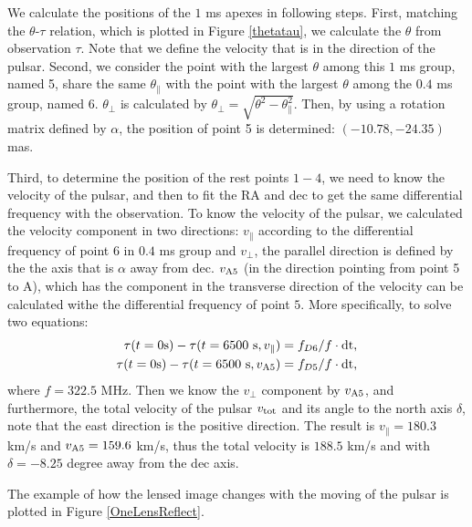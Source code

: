 \documentclass[useAMS,usenatbib]{mn2e}
\begin{document}
We calculate the positions of the $1$ ms apexes in following steps. First, matching the $\theta$-$\tau$ relation, which is plotted in Figure \ref{thetatau}, we calculate the $\theta$ from observation $\tau$. Note that we define the velocity that is in the direction of the pulsar. Second, we consider the point with the largest $\theta$ among this $1$ ms group, named 5, share the same $\theta_{\parallel}$ with the point with the largest $\theta$ among the $0.4$ ms group, named 6. $\theta_{\bot}$ is calculated by $\theta_{\bot}=\sqrt{\theta^2-\theta_{\parallel} ^2} $. Then, by using a rotation matrix defined by $\alpha$, the position of point 5 is determined: $(-10.78,-24.35)$ mas. 

Third, to determine the position of the rest points $1-4$, we need to know the velocity of the pulsar, and then to fit the RA and dec to get the same differential frequency with the observation. To know the velocity of the pulsar, we calculated the velocity component in two directions: $v_{\parallel}$ according to the differential frequency of point $6$ in $0.4$ ms group and $v_{\bot}$, the parallel direction is defined by the the axis that is $\alpha$ away from dec. $v_{\rm A5}$ (in the direction pointing from point 5 to A), which has the component in the transverse direction of the velocity can be calculated withe the differential frequency of point $5$. More specifically, to solve two equations: 
\begin{align*}
\tau(t=0{\rm s})-\tau(t=6500~{\rm s},v_{\parallel})&=f_{D6}/f\cdot{\rm dt},\\
\tau(t=0 {\rm s}) -\tau(t=6500~{\rm s}, v_{\rm A5}) & = f_{D5} /f\cdot{\rm dt},
\end{align*}
where $f=322.5$ MHz. Then we know the $v_{\bot}$ component by $v_{\rm A5}$, and furthermore, the total velocity of the pulsar $v_{\rm tot}$ and its angle to the north axis $\delta$, note that the east direction is the positive direction. The result is $v_{\parallel}=180.3$ km/s and $v_{\rm A5}=159.6$ km/s, thus the total velocity is $188.5$ km/s and with $\delta=-8.25$ degree away from the dec axis.

The example of how the lensed image changes with the moving of the pulsar is plotted in Figure \ref{OneLensReflect}. 
\end{document}
